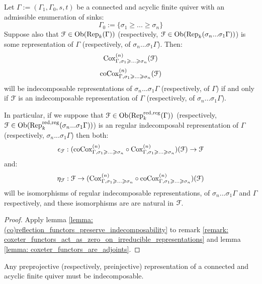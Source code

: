             \begin{corollary} \label{coro: coxeter_functors_preserve_indecomposability}
                Let $\Gamma := (\Gamma_1, \Gamma_0, s, t)$ be a connected and acyclic finite quiver with an admissible enumeration of sinks:
                    $$\Gamma_0 := \{\sigma_1 \geq ... \geq \sigma_n\}$$
                Suppose also that $\mathcal{F} \in \mathrm{Ob}(\mathrm{Rep}_k(\Gamma))$ (respectively, $\mathcal{F} \in \mathrm{Ob}(\mathrm{Rep}_k(\sigma_n ... \sigma_1 \Gamma))$) is some representation of $\Gamma$ (respectively, of $\sigma_n ... \sigma_1 \Gamma$). Then:
                    $$\mathrm{Cox}_{\Gamma, \sigma_1 \geqslant ...\geqslant \sigma_n}^{(n)}(\mathcal{F})$$
                    $$\mathrm{co}\mathrm{Cox}_{\Gamma, \sigma_1 \geqslant ...\geqslant \sigma_n}^{(n)}(\mathcal{F})$$
                will be indecomposable representations of $\sigma_n ... \sigma_1 \Gamma$ (respectively, of $\Gamma$) if and only if $\mathcal{F}$ is an indecomposable representation of $\Gamma$ (respectively, of $\sigma_n ... \sigma_1 \Gamma$).
                
                In particular, if we suppose that $\mathcal{F} \in \mathrm{Ob}(\mathrm{Rep}_k^{\mathrm{red}, \mathrm{reg}}(\Gamma))$ (respectively, $\mathcal{F} \in \mathrm{Ob}(\mathrm{Rep}_k^{\mathrm{red}, \mathrm{reg}}(\sigma_n ... \sigma_1 \Gamma))$) is an regular indecomposabl representation of $\Gamma$ (respectively, $\sigma_n ... \sigma_1 \Gamma$) then both:
                    $$\epsilon_{\mathcal{F}}: (\mathrm{co}\mathrm{Cox}_{\Gamma, \sigma_1 \geqslant ...\geqslant \sigma_n}^{(n)} \circ \mathrm{Cox}_{\Gamma, \sigma_1 \geqslant ...\geqslant \sigma_n}^{(n)})(\mathcal{F}) \to \mathcal{F}$$
                and:
                    $$\eta_{\mathcal{F}}: \mathcal{F} \to (\mathrm{Cox}_{\Gamma, \sigma_1 \geqslant ...\geqslant \sigma_n}^{(n)} \circ \mathrm{co}\mathrm{Cox}_{\Gamma, \sigma_1 \geqslant ...\geqslant \sigma_n}^{(n)})(\mathcal{F})$$
                will be isomorphisms of regular indecomposable representations, of $\sigma_n ... \sigma_1 \Gamma$ and $\Gamma$ respectively, and these isomorphisms are are natural in $\mathcal{F}$.
            \end{corollary}
                \begin{proof}
                    Apply lemma \ref{lemma: (co)reflection_functors_preserve_indecomposability} to remark \ref{remark: coxeter_functors_act_as_zero_on_irreducible_representations} and lemma \ref{lemma: coxeter_functors_are_adjoints}.
                \end{proof}
            \begin{corollary} \label{coro: preprojective_and_preinjective_representations_are_indecomposable}
                Any preprojective (respectively, preinjective) representation of a connected and acyclic finite quiver must be indecomposable. 
            \end{corollary}    
